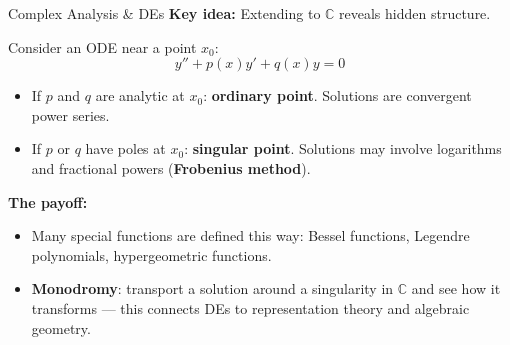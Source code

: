 \begin{frame}{Complex Analysis \& DEs}
\textbf{Key idea:} Extending to $\mathbb{C}$ reveals hidden structure.

\vspace{0.3cm}
Consider an ODE near a point $x_0$:
\[
y'' + p(x)y' + q(x)y = 0
\]

\begin{itemize}
    \item If $p$ and $q$ are analytic at $x_0$: \textbf{ordinary point}. Solutions are convergent power series.
    \item If $p$ or $q$ have poles at $x_0$: \textbf{singular point}. Solutions may involve logarithms and fractional powers (\textbf{Frobenius method}).
\end{itemize}

\vspace{0.3cm}
\textbf{The payoff:}
\begin{itemize}
    \item Many special functions are defined this way: Bessel functions, Legendre polynomials, hypergeometric functions.
    \item \textbf{Monodromy}: transport a solution around a singularity in $\mathbb{C}$ and see how it transforms --- this connects DEs to representation theory and algebraic geometry.
\end{itemize}
\end{frame}
